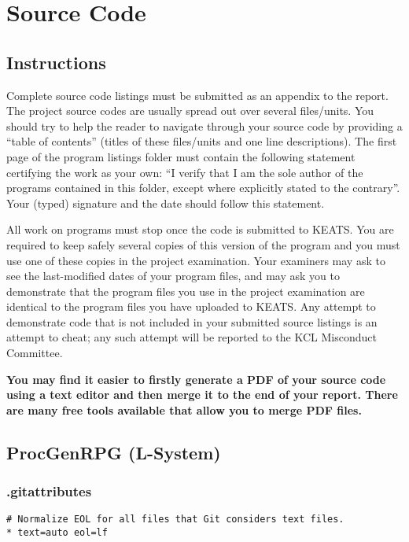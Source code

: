 \chapter{Source Code} \label{Code}

\section{Instructions}
Complete source code listings must be submitted as an appendix to the report. The project source codes are usually spread out over several files/units. You should try to help the reader to navigate through your source code by providing a ``table of contents'' (titles of these files/units and one line descriptions). The first page of the program listings folder must contain the following statement certifying the work as your own: ``I verify that I am the sole author of the programs contained in this folder, except where explicitly stated to the contrary''. Your (typed) signature and the date should follow this statement.

All work on programs must stop once the code is submitted to KEATS. You are required to keep safely several copies of this version of the program and you must use one of these copies in the project examination. Your examiners may ask to see the last-modified dates of your program files, and may ask you to demonstrate that the program files you use in the project examination are identical to the program files you have uploaded to KEATS. Any attempt to demonstrate code that is not included in your submitted source listings is an attempt to cheat; any such attempt will be reported to the KCL Misconduct Committee.

\textbf{You may find it easier to firstly generate a PDF of your source code using a text editor and then merge it to the end of your report. There are many free tools available that allow you to merge PDF files.}

\section{ProcGenRPG (L-System)}

\subsection{.gitattributes}

\begin{lstlisting}
# Normalize EOL for all files that Git considers text files.
* text=auto eol=lf
\end{lstlisting}

